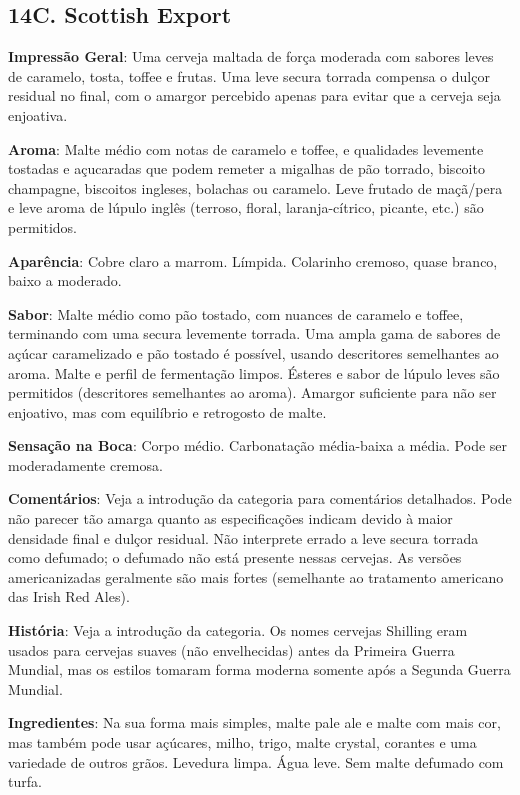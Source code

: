 \subsection*{14C. Scottish Export}
\textbf{Impressão Geral}: Uma cerveja maltada de força moderada com sabores leves de caramelo, tosta, toffee e frutas. Uma leve secura torrada compensa o dulçor residual no final, com o amargor percebido apenas para evitar que a cerveja seja enjoativa.

\textbf{Aroma}: Malte médio com notas de caramelo e toffee, e qualidades levemente tostadas e açucaradas que podem remeter a migalhas de pão torrado, biscoito champagne, biscoitos ingleses, bolachas ou caramelo. Leve frutado de maçã/pera e leve aroma de lúpulo inglês (terroso, floral, laranja-cítrico, picante, etc.) são permitidos.

\textbf{Aparência}: Cobre claro a marrom. Límpida. Colarinho cremoso, quase branco, baixo a moderado.

\textbf{Sabor}: Malte médio como pão tostado, com nuances de caramelo e toffee, terminando com uma secura levemente torrada. Uma ampla gama de sabores de açúcar caramelizado e pão tostado é possível, usando descritores semelhantes ao aroma. Malte e perfil de fermentação limpos. Ésteres e sabor de lúpulo leves são permitidos (descritores semelhantes ao aroma). Amargor suficiente para não ser enjoativo, mas com equilíbrio e retrogosto de malte.

\textbf{Sensação na Boca}: Corpo médio. Carbonatação média-baixa a média. Pode ser moderadamente cremosa.

\textbf{Comentários}: Veja a introdução da categoria para comentários detalhados. Pode não parecer tão amarga quanto as especificações indicam devido à maior densidade final e dulçor residual. Não interprete errado a leve secura torrada como defumado; o defumado não está presente nessas cervejas. As versões americanizadas geralmente são mais fortes (semelhante ao tratamento americano das Irish Red Ales).

\textbf{História}: Veja a introdução da categoria. Os nomes cervejas Shilling eram usados para cervejas suaves (não envelhecidas) antes da Primeira Guerra Mundial, mas os estilos tomaram forma moderna somente após a Segunda Guerra Mundial.

\textbf{Ingredientes}: Na sua forma mais simples, malte pale ale e malte com mais cor, mas também pode usar açúcares, milho, trigo, malte crystal, corantes e uma variedade de outros grãos. Levedura limpa. Água leve. Sem malte defumado com turfa.

